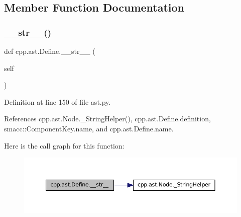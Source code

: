 \subsection{Member Function Documentation}
\mbox{\label{classcpp_1_1ast_1_1Define_aa89732914b19901c8d291e11f34bb627}} 
\subsubsection{\texorpdfstring{\+\_\+\+\_\+str\+\_\+\+\_\+()}{\_\_str\_\_()}}
{\footnotesize\ttfamily def cpp.\+ast.\+Define.\+\_\+\+\_\+str\+\_\+\+\_\+ (\begin{DoxyParamCaption}\item[{}]{self }\end{DoxyParamCaption})}



Definition at line 150 of file ast.\+py.



References cpp.\+ast.\+Node.\+\_\+\+String\+Helper(), cpp.\+ast.\+Define.\+definition, smacc\+::\+Component\+Key.\+name, and cpp.\+ast.\+Define.\+name.


Here is the call graph for this function\+:
\nopagebreak
\begin{figure}[H]
\begin{center}
\leavevmode
\includegraphics[width=350pt]{classcpp_1_1ast_1_1Define_aa89732914b19901c8d291e11f34bb627_cgraph}
\end{center}
\end{figure}


